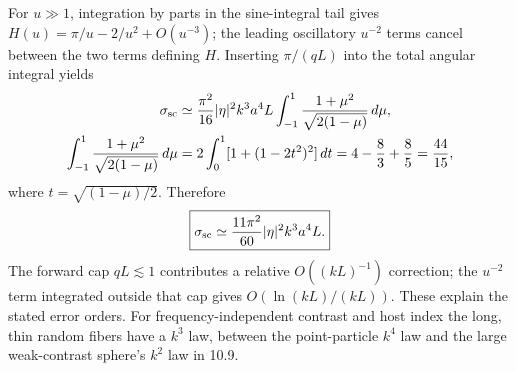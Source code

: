 For $u\gg1$, integration by parts in the sine-integral tail gives
$H(u)=\pi/u-2/u^2+O(u^{-3})$; the leading oscillatory $u^{-2}$
terms cancel between the two terms defining $H$.
Inserting $\pi/(qL)$ into the total angular integral yields
\[
\begin{split}
\sigma_{\rm sc}
&\simeq\frac{\pi^2}{16}|\eta|^2k^3a^4L
\int_{-1}^1\frac{1+\mu^2}{\sqrt{2(1-\mu)}}\,d\mu,\\
\int_{-1}^1\frac{1+\mu^2}{\sqrt{2(1-\mu)}}\,d\mu
&=2\int_0^1[1+(1-2t^2)^2]\,dt
=4-\frac83+\frac85=\frac{44}{15},
\end{split}
\]
where $t=\sqrt{(1-\mu)/2}$. Therefore
\[
\boxed{\sigma_{\rm sc}\simeq\frac{11\pi^2}{60}
|\eta|^2k^3a^4L.}
\]
The forward cap $qL\lesssim1$ contributes a relative $O((kL)^{-1})$
correction; the $u^{-2}$ term integrated outside that cap gives
$O(\ln(kL)/(kL))$. These explain the stated error orders.
For frequency-independent contrast and host index the long, thin
random fibers have a $k^3$ law, between the point-particle $k^4$ law
and the large weak-contrast sphere's $k^2$ law in 10.9.
